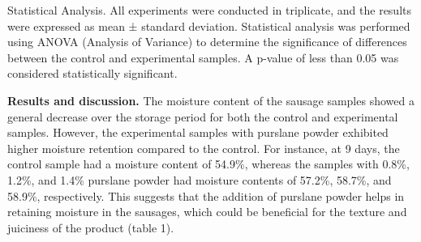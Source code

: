 \begin{multicols}{2}
Statistical Analysis. All experiments were conducted in triplicate, and
the results were expressed as mean ± standard deviation. Statistical
analysis was performed using ANOVA (Analysis of Variance) to determine
the significance of differences between the control and experimental
samples. A p-value of less than 0.05 was considered statistically
significant.

{\bfseries Results and discussion.} The moisture content of the sausage
samples showed a general decrease over the storage period for both the
control and experimental samples. However, the experimental samples with
purslane powder exhibited higher moisture retention compared to the
control. For instance, at 9 days, the control sample had a moisture
content of 54.9\%, whereas the samples with 0.8\%, 1.2\%, and 1.4\%
purslane powder had moisture contents of 57.2\%, 58.7\%, and 58.9\%,
respectively. This suggests that the addition of purslane powder helps
in retaining moisture in the sausages, which could be beneficial for the
texture and juiciness of the product (table 1).
\end{multicols}


